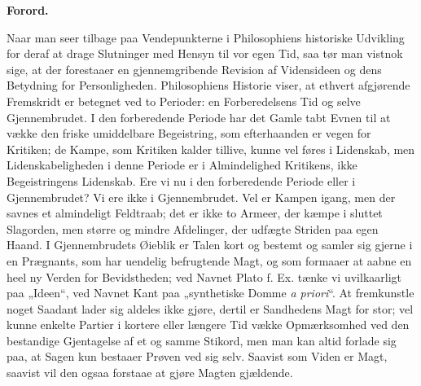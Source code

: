 \documentclass[12pt,a4paper]{book}
\newcommand{\opage}[1]{\marginnote{\footnotesize\textit{[#1]}}}
\begin{document}
\clearpage
\opage{3}\setcounter{footnote}{0}%
\begin{center}\textbf{Forord.}\end{center}
Naar man seer tilbage paa Vendepunkterne i Philosophiens
historiske Udvikling for deraf at drage Slutninger
med Hensyn til vor egen Tid, saa tør man vistnok sige,
at der forestaaer en gjennemgribende Revision af Vidensideen
og dens Betydning for Personligheden. Philosophiens
Historie viser, at ethvert afgjørende Fremskridt
er betegnet ved to Perioder: en Forberedelsens Tid og
selve Gjennembrudet. I den forberedende Periode har
det Gamle tabt Evnen til at vække den friske umiddelbare
Begeistring, som efterhaanden er vegen for Kritiken;
de Kampe, som Kritiken kalder tillive, kunne vel
føres i Lidenskab, men Lidenskabeligheden i denne Periode
er i Almindelighed Kritikens, ikke Begeistringens
Lidenskab. Ere vi nu i den forberedende Periode eller i
Gjennembrudet? Vi ere ikke i Gjennembrudet. Vel
er Kampen igang, men der savnes et almindeligt
Feldtraab; det er ikke to Armeer, der kæmpe i sluttet
Slagorden, men større og mindre Afdelinger, der udfægte
Striden paa egen Haand. I Gjennembrudets
Øieblik er Talen kort og bestemt og samler sig gjerne i
\opage{4}\setcounter{footnote}{0}%
en Prægnants, som har uendelig befrugtende Magt, og
som formaaer at aabne en heel ny Verden for Bevidstheden;
ved Navnet Plato f. Ex. tænke vi uvilkaarligt
paa „Ideen“, ved Navnet Kant paa „synthetiske Domme
\textit{a priori}“. At fremkunstle noget Saadant lader sig aldeles
ikke gjøre, dertil er Sandhedens Magt for stor; vel kunne enkelte
Partier i kortere eller længere Tid vække Opmærksomhed
ved den bestandige Gjentagelse af et og samme Stikord,
men man kan altid forlade sig paa, at Sagen kun
bestaaer Prøven ved sig selv. Saavist som Viden er
Magt, saavist vil den ogsaa forstaae at gjøre Magten
gjældende.
\end{document}
